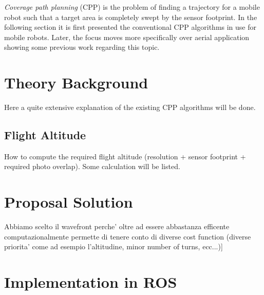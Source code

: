 
\textit{Coverage path planning} (CPP) is the problem of finding a trajectory for a mobile robot such that a target area is completely swept by the sensor footprint. In the following section it is first presented the conventional CPP algorithms in use for mobile robots. Later, the focus moves more specifically over aerial application showing some previous work regarding this topic.


\section{Theory Background} %
\label{sec:theory_background}
Here a quite extensive explanation of the existing CPP algorithms will be done.

\subsection{Flight Altitude} %
\label{sub:flight_altitude}
How to compute the required flight altitude (resolution + sensor footprint + required photo overlap). Some calculation will be listed.



\section{Proposal Solution} %
\label{sec:proposal_solution}

Abbiamo scelto il wavefront perche' oltre ad essere abbastanza efficente computazionalmente permette di tenere conto di diverse cost function (diverse priorita' come ad esempio l'altitudine, minor number of turns, ecc...)]


\section{Implementation in ROS} %
\label{sec:implementation_in_ros}


